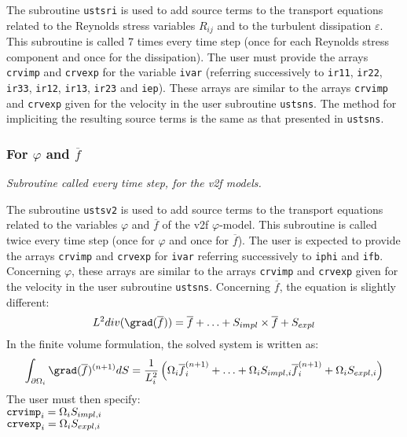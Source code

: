 {{{The subroutine \texttt{ustsri} is used to add source terms to the transport equations
related to the Reynolds stress variables $R_{ij}$ and to the turbulent
dissipation $\varepsilon$.
This subroutine is called 7 times every time step
(once for each Reynolds stress component and once for the
dissipation). The user must provide the arrays \texttt{crvimp} and
\texttt{crvexp} for the variable \texttt{ivar} (referring successively to
\texttt{ir11}, \texttt{ir22}, \texttt{ir33},
\texttt{ir12}, \texttt{ir13}, \texttt{ir23} and
\texttt{iep}). These arrays are similar to the arrays \texttt{crvimp}
and \texttt{crvexp} given for the velocity in the user subroutine
\texttt{ustsns}. The method for impliciting the resulting source terms is the
same as that presented in \texttt{ustsns}.

\subsubsection{For $\varphi$ and $\overline{f}$}
\label{sec:prg_ustsv2}

\noindent
\textit{Subroutine called every time step, for the v2f models.}

The subroutine \texttt{ustsv2} is used to add source terms to the transport equations
related to the variables $\varphi$ and $\overline{f}$ of the v2f
$\varphi$-model. This subroutine is called twice
every time step (once for $\varphi$ and once for $\overline{f}$).
The user is expected to provide the arrays \texttt{crvimp} and
\texttt{crvexp} for \texttt{ivar} referring successively to \texttt{iphi}
and \texttt{ifb}. Concerning $\varphi$, these arrays are similar to the arrays
\texttt{crvimp} and \texttt{crvexp} given for the velocity in the user subroutine
\texttt{ustsns}. Concerning $\overline{f}$, the equation is slightly
different:
\begin{displaymath}
L^2 div(\grad(\overline{f})) = \overline{f} + \ldots + S_{impl}\times\overline{f}+S_{expl}
\end{displaymath}
In the finite volume formulation, the solved system is written as:
\begin{displaymath}
\int_{\partial\Omega_i}\grad(\overline{f})^{(n+1)}dS=\frac{1}{L_i^2}\left(
\Omega_i\overline{f}^{(n+1)}_i + \ldots +  \Omega_iS_{impl,i}\overline{f}_i^{(n+1)} +
\Omega_iS_{expl,i} \right)
\end{displaymath}
The user must then specify:\\
$\text{\texttt{crvimp}}_i=\Omega_iS_{impl,i}$\\
$\text{\texttt{crvexp}}_i=\Omega_iS_{expl,i}$

}}}
